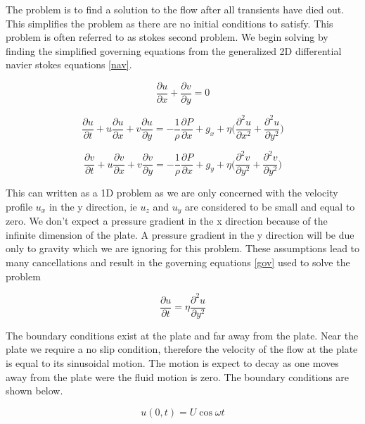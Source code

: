 \documentclass[paper=a4, fontsize=12pt, abstract=on]{scrartcl}
\numberwithin{equation}{section}		%
\numberwithin{figure}{section}			%
\numberwithin{table}{section}				%
\begin{document}
 The problem is to find a solution to the flow after all transients have died out. This simplifies the problem as there are no initial conditions to satisfy. This problem is often referred to as stokes second problem. We begin solving by finding the simplified governing equations from the generalized 2D differential navier stokes equations \ref{nav}. 

 \begin{equation}
\label{gov}
\frac{\partial u}{\partial x}+\frac{\partial v}{\partial y} = 0
\end{equation} 

 \begin{equation}
\label{nav}
\frac{\partial u}{\partial t} +u\frac{\partial u}{\partial x}+v\frac{\partial u}{\partial y} = -\frac{1}{\rho}\frac{\partial P}{\partial x} + g_x + \eta \Bigg(  \frac{\partial^2 u}{\partial x^2} + \frac{\partial^2 u}{\partial y^2} \Bigg)
\end{equation} 

 \begin{equation}
\label{gov}
\frac{\partial v}{\partial t} +u\frac{\partial v}{\partial x}+v\frac{\partial v}{\partial y} = -\frac{1}{\rho}\frac{\partial P}{\partial x} + g_y + \eta \Bigg( \frac{\partial^2 v}{\partial y^2} +  \frac{\partial^2 v}{\partial y^2} \Bigg)
\end{equation} 

This can written as a 1D problem as we are only concerned with the velocity profile $u_x$ in the y direction, ie $u_z$ and $u_y$ are considered to be small and equal to zero. We don't expect a pressure gradient in the x direction because of the infinite dimension of the plate. A pressure gradient in the y direction will be due only to gravity which we are ignoring for this problem. These assumptions lead to many cancellations and result in the governing equations \ref{gov} used to solve the problem


 \begin{equation}
\label{gov}
\frac{\partial u}{\partial t} = \eta \frac{\partial^2 u}{\partial y^2}
\end{equation} 


The boundary conditions exist at the plate and far away from the plate. Near the plate we require a no slip condition, therefore the velocity of the flow at the plate is equal to its sinusoidal motion. The motion is expect to decay as one moves away from the plate were the fluid motion is zero. The boundary conditions are shown below.

 \begin{equation}
\label{b1}
u(0,t) = U\cos \omega t
\end{equation}
\end{document}
